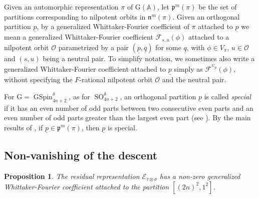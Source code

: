 \documentclass[12pt]{amsart}
\newcommand{\A}{\mathbb{A}}
\newcommand{\CE}{{\mathcal{E}}}
\newcommand{\RG}{{\mathrm {G}}}
\newtheorem{proposition}[theorem]{Proposition}%
\theoremstyle{remark}
\DeclareMathOperator{\SO}{SO}
\DeclareMathOperator{\GSpin}{GSpin}
\begin{document}
Given an automorphic representation $\pi$ of $\RG(\A)$, let $\mathfrak{p}^m(\pi)$ be the set of partitions corresponding to nilpotent orbits in $\mathfrak{n}^m(\pi)$.
Given an orthogonal partition $\underline{p}$, by a generalized Whittaker-Fourier coefficient of $\pi$ attached to $\underline{p}$ we mean
 a generalized
Whittaker-Fourier coefficient $\mathcal{F}_{s,u}(\phi)$ attached to a nilpotent orbit $\mathcal{O}$ parametrized by a pair $(\underline{p}, \underline{q})$ for some $\underline{q}$, with $\phi \in V_\pi$, $u\in \mathcal{O}$ and $(s,u)$ being a neutral pair. 
To simplify notation, we sometimes also write a generalized Whittaker-Fourier coefficient attached to $\underline{p}$ simply as $\mathcal{F}^{\psi_{\underline{p}}}(\phi)$,  without specifying the $F$-rational nilpotent orbit $\mathcal{O}$ and the neutral pair.

For $\RG=\GSpin_{4n+2}^\delta$, as for $\SO_{4n+2}^\delta$, an orthogonal partition $\underline{p}$ is called {\it special} if it has an even number of odd parts between two consecutive even parts and an even number of odd parts greater than the largest even part (see \cite[Section 6.3]{CollingwoodMcGovern1993}). 
 By the main results of \cite{JiangLiuSavin2016}, if $\underline{p} \in \mathfrak{p}^m(\pi)$, then $\underline{p}$ is special. 


\subsection{Non-vanishing of the descent}

\begin{proposition}
\label{prop-nonvanishing-toporbit}
The residual representation $\CE_{\tau \otimes \sigma}$ has a non-zero generalized Whittaker-Fourier coefficient attached to the partition $[(2n)^2, 1^2]$.
\end{proposition}
\end{document}
